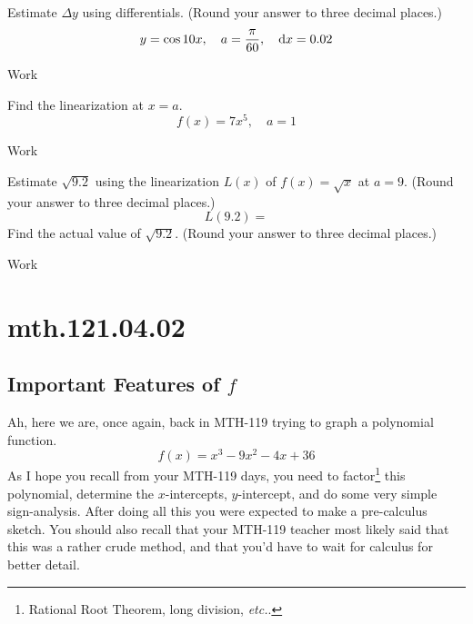\documentclass[12pt,addpoints, answers, fleqn]{exam}
\begin{document}
\begin{teacher}
\begin{questions}
\question 	%

Estimate $\Delta y$ using differentials. (Round your answer to three decimal places.)
\[
y = \cos 10x, \quad a = \frac{\pi}{60}, \quad {\rm{d}} x = 0.02
\]
\begin{solution}
Work
\end{solution}

\question 	%

Find the linearization at $x = a$.
\[
f\left(x\right) = 7x^5, \quad a = 1
\]
\begin{solution}
Work
\end{solution}

\question 	%

Estimate $\sqrt{9.2}$ using the linearization $L\left(x\right)$ of $f\left(x\right) = \sqrt{x}$ at 
$a = 9$. (Round your answer to three decimal places.)
\[
L\left(9.2\right) =
\]
Find the actual value of $\sqrt{9.2}$. (Round your answer to three decimal places.)
\begin{solution}
Work
\end{solution}
\end{questions}
\end{teacher}
\vfill
\pagebreak







\section{mth.121.04.02}
\subsection{Important Features of $f$}

Ah, here we are, once again, back in MTH-119 trying to graph a polynomial function.
\[
f \left( x \right) = x^3 - 9 x^2 - 4x +36
\]
As I hope you recall from your MTH-119 days, you need to factor\footnote{Rational Root Theorem, long division, \emph{etc.}.} this polynomial, determine the $x$-intercepts, $y$-intercept, and do some very simple sign-analysis. After doing all this you were expected to make a pre-calculus sketch. You should also recall that your MTH-119 teacher most likely said that this was a rather crude method, and that you'd have to wait for calculus for better detail.
\end{document}
